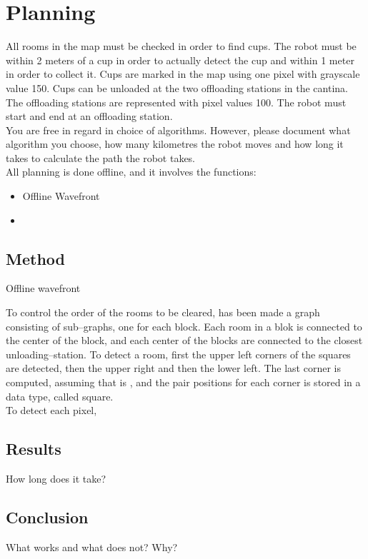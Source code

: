 \section{Planning}
\label{sec::planning}
All rooms in the map must be checked in order to find cups. The robot must be within 2 meters of a cup in order to actually detect the cup and within 1 meter in order to collect it. Cups are marked in the map using one pixel with grayscale value 150. Cups can be unloaded at the two offloading stations in the cantina. The offloading stations are represented with pixel values 100. The robot must start and end at an offloading station.\\[0.2cm]
You are free in regard in choice of algorithms. However, please document what algorithm you choose, how many kilometres the robot moves and how long it takes to calculate the path the robot takes.\\[0.2cm]
All planning is done offline, and it involves the functions:
\begin{itemize}\itemsep-3pt
\item Offline Wavefront
\item 
\end{itemize}

\subsection{Method}
Offline wavefront

To control the order of the rooms to be cleared, has been made a graph consisting of sub--graphs, one for each block. Each room in a blok is connected to the center of the block, and each center of the blocks are connected to the closest unloading--station. To detect a room, first the upper left corners of the squares are detected, then the upper right and then the lower left. The last corner is computed, assuming that is , and the pair positions for each corner is stored in a data type, called square.\\[0.2cm]
To detect each pixel, 

\subsection{Results}
How long does it take?

\subsection{Conclusion}
What works and what does not? Why?
